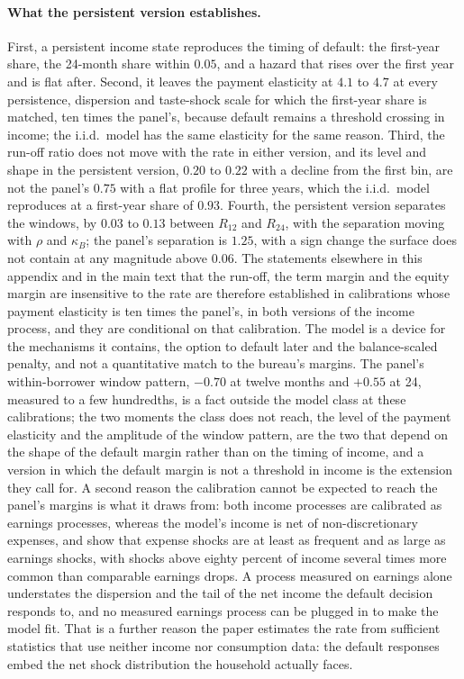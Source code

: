 \paragraph{What the persistent version establishes.} First, a persistent income state reproduces the timing of default: the first-year share, the 24-month share within $0.05$, and a hazard that rises over the first year and is flat after. Second, it leaves the payment elasticity at $4.1$ to $4.7$ at every persistence, dispersion and taste-shock scale for which the first-year share is matched, ten times the panel's, because default remains a threshold crossing in income; the i.i.d.\ model has the same elasticity for the same reason. Third, the run-off ratio does not move with the rate in either version, and its level and shape in the persistent version, $0.20$ to $0.22$ with a decline from the first bin, are not the panel's $0.75$ with a flat profile for three years, which the i.i.d.\ model reproduces at a first-year share of $0.93$. Fourth, the persistent version separates the windows, by $0.03$ to $0.13$ between $R_{12}$ and $R_{24}$, with the separation moving with $\rho$ and $\kappa_B$; the panel's separation is $1.25$, with a sign change the surface does not contain at any magnitude above $0.06$. The statements elsewhere in this appendix and in the main text that the run-off, the term margin and the equity margin are insensitive to the rate are therefore established in calibrations whose payment elasticity is ten times the panel's, in both versions of the income process, and they are conditional on that calibration. The model is a device for the mechanisms it contains, the option to default later and the balance-scaled penalty, and not a quantitative match to the bureau's margins. The panel's within-borrower window pattern, $-0.70$ at twelve months and $+0.55$ at 24, measured to a few hundredths, is a fact outside the model class at these calibrations; the two moments the class does not reach, the level of the payment elasticity and the amplitude of the window pattern, are the two that depend on the shape of the default margin rather than on the timing of income, and a version in which the default margin is not a threshold in income is the extension they call for. A second reason the calibration cannot be expected to reach the panel's margins is what it draws from: both income processes are calibrated as earnings processes, whereas the model's income is net of non-discretionary expenses, and \citet{fulford_expense_2024} show that expense shocks are at least as frequent and as large as earnings shocks, with shocks above eighty percent of income several times more common than comparable earnings drops. A process measured on earnings alone understates the dispersion and the tail of the net income the default decision responds to, and no measured earnings process can be plugged in to make the model fit. That is a further reason the paper estimates the rate from sufficient statistics that use neither income nor consumption data: the default responses embed the net shock distribution the household actually faces.
